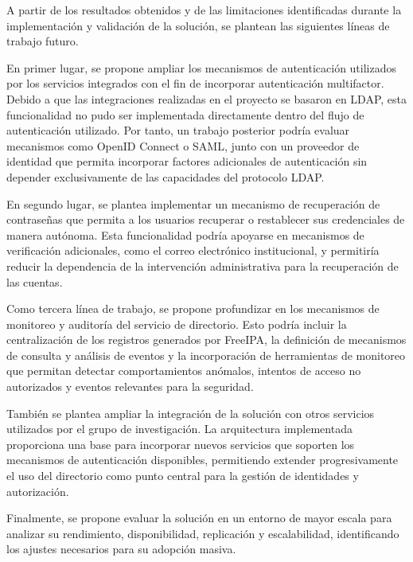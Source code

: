 \label{cap:trabajos-futuros}
\vspace*{0.7cm}

A partir de los resultados obtenidos y de las limitaciones identificadas durante la implementación y validación de la solución, se plantean las siguientes líneas de trabajo futuro.

En primer lugar, se propone ampliar los mecanismos de autenticación utilizados por los servicios integrados con el fin de incorporar autenticación multifactor. Debido a que las integraciones realizadas en el proyecto se basaron en LDAP, esta funcionalidad no pudo ser implementada directamente dentro del flujo de autenticación utilizado. Por tanto, un trabajo posterior podría evaluar mecanismos como OpenID Connect o SAML, junto con un proveedor de identidad que permita incorporar factores adicionales de autenticación sin depender exclusivamente de las capacidades del protocolo LDAP.

En segundo lugar, se plantea implementar un mecanismo de recuperación de contraseñas que permita a los usuarios recuperar o restablecer sus credenciales de manera autónoma. Esta funcionalidad podría apoyarse en mecanismos de verificación adicionales, como el correo electrónico institucional, y permitiría reducir la dependencia de la intervención administrativa para la recuperación de las cuentas.

Como tercera línea de trabajo, se propone profundizar en los mecanismos de monitoreo y auditoría del servicio de directorio. Esto podría incluir la centralización de los registros generados por FreeIPA, la definición de mecanismos de consulta y análisis de eventos y la incorporación de herramientas de monitoreo que permitan detectar comportamientos anómalos, intentos de acceso no autorizados y eventos relevantes para la seguridad.

También se plantea ampliar la integración de la solución con otros servicios utilizados por el grupo de investigación. La arquitectura implementada proporciona una base para incorporar nuevos servicios que soporten los mecanismos de autenticación disponibles, permitiendo extender progresivamente el uso del directorio como punto central para la gestión de identidades y autorización.

Finalmente, se propone evaluar la solución en un entorno de mayor escala para analizar su rendimiento, disponibilidad, replicación y escalabilidad, identificando los ajustes necesarios para su adopción masiva.
